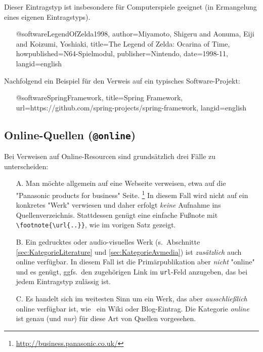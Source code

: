 Dieser Eintragstyp ist insbesondere für Computerspiele geeignet (in Ermangelung eines eigenen Eintragstyps).
%
\begin{itemize}
\item[] 
\begin{GenericCode}[numbers=none]
@software{LegendOfZelda1998,
  author={Miyamoto, Shigeru and Aonuma, Eiji and Koizumi, Yoshiaki},
  title={The Legend of Zelda: Ocarina of Time},
  howpublished={N64-Spielmodul},
  publisher={Nintendo},
  date={1998-11},
  langid={english}
}
\end{GenericCode}
\item[\cite{LegendOfZelda1998}] 
\end{itemize}

\noindent
Nachfolgend ein Beispiel für den Verweis auf ein typisches Software-Projekt:
%
\begin{itemize}
\item[] 
\begin{GenericCode}[numbers=none]
@software{SpringFramework,
  title={Spring Framework},
  url={https://github.com/spring-projects/spring-framework},
  langid={english}
}
\end{GenericCode}
\item[\cite{SpringFramework}] 
\end{itemize}



\subsection{Online-Quellen (\texttt{\bfseries @online})}
\label{sec:KategorieOnline}

Bei Verweisen auf Online-Resourcen sind grundsätzlich drei Fälle zu unterscheiden:
%
\begin{itemize}
\item[A.] Man möchte allgemein auf eine Webseite verweisen, etwa auf die "Panasonic products for business" Seite.%
\footnote{\url{http://business.panasonic.co.uk/}}
In diesem Fall wird nicht auf ein konkretes "Werk" verwiesen und daher erfolgt \emph{keine} Aufnahme ins
Quellenverzeichnis. Stattdessen genügt eine einfache Fußnote mit \verb!\footnote{\url{..}}!, wie im vorigen Satz
gezeigt.
%
\item[B.] Ein gedrucktes oder audio-visuelles Werk (s.\ Abschnitte \ref{sec:KategorieLiterature} und
\ref{sec:KategorieAvmedia}) ist \emph{zusätzlich} auch online verfügbar. In diesem Fall ist die Primär\-publikation
aber \emph{nicht} "online" und es genügt, ggfs.\ den zugehörigen Link im \texttt{url}-Feld anzugeben, das bei jedem
Eintragstyp zulässig ist.
%
\item[C.] Es handelt sich im weitesten Sinn um ein Werk, das aber \emph{ausschließlich} online verfügbar ist, wie
\zB\ ein Wiki oder Blog-Eintrag. Die Kategorie \emph{online} ist genau (und \emph{nur}) für diese Art von Quellen
vorgesehen.
\end{itemize}


